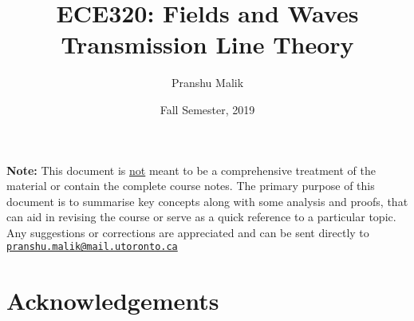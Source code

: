 \documentclass[10pt]{article}
\date{Fall Semester, 2019}
\begin{document}
\title{\textbf{\Large{\textsc{ECE320:} Fields and Waves}} \\ \Large{Transmission Line Theory}\vspace{-0.3cm}}
\author{Pranshu Malik}

\maketitle
\tableofcontents
\blfootnote
{
    \textbf{Note:} This document is \underline{not} meant to be a comprehensive treatment of the material 
    or contain the complete course notes. The primary purpose of this document is to summarise key concepts
    along with some analysis and proofs, that can aid in revising the course or serve as a quick reference 
    to a particular topic. Any suggestions or corrections are appreciated and can be
    sent directly to \texttt{\href{mailto:pranshu.malik@mail.utoronto.ca}{pranshu.malik@mail.utoronto.ca}}
}

\section{Acknowledgements}
\end{document}
